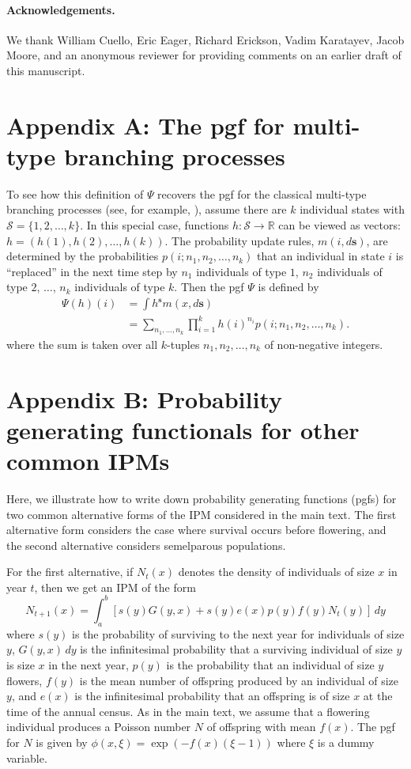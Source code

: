 \documentclass[12pt]{amsart}\usepackage[]{graphicx}\usepackage[]{color}
\def\R{\mathbb R}
\def\S{\mathcal S}
\def\s{\mathbf s}
\begin{document}
\vskip 0.1in
\paragraph{\bf Acknowledgements.} We thank William Cuello, Eric Eager, Richard Erickson, Vadim Karatayev, Jacob Moore, and an anonymous reviewer for providing comments on an earlier draft of this manuscript.


\newpage
\section*{Appendix A: The pgf for multi-type branching processes}
To see how this definition of $\Psi$ recovers the pgf for the classical multi-type branching processes (see, for example, \citet{caswell-01}),  assume there are $k$ individual states with $\S=\{1,2,\dots,k\}$. In this special case, functions $h:\S\to \R$ can be viewed as vectors: $h=(h(1),h(2),\dots,h(k))$. The probability update rules, $m(i,d\s)$, are determined by the probabilities $p(i;n_1,n_2,\dots,n_k)$ that an individual in state $i$ is ``replaced'' in the next time step by  $n_1$ individuals of type $1$, $n_2$ individuals of type $2$, $\dots$, $n_k$ individuals of type $k$. Then the pgf $\Psi$ is defined by
\[
\begin{aligned}
\Psi(h)(i)&=\int h^\s m(x,d\s)\\
&= \sum_{n_1,\dots,n_k} \prod_{i=1}^k h(i)^{n_i} p(i;n_1,n_2,\dots,n_k).
\end{aligned}
\]
where the sum is taken over all $k$-tuples $n_1,n_2,\dots,n_k$ of non-negative integers.

\newpage

\section*{Appendix B: Probability generating functionals for other common IPMs}
Here, we illustrate how to write down probability generating functions (pgfs) for two common alternative forms of the IPM considered in the main text. The first alternative form considers the case where survival occurs before flowering, and the second alternative considers semelparous populations.

For the first alternative, if $N_t(x)$ denotes the density of individuals of size $x$ in year $t$, then we get an IPM of the form
\[
N_{t+1}(x)=\int_a^b \left[ s(y)G(y, x)+s(y)e(x)p(y)f(y)N_t(y)\right]\, dy
\]
where $s(y)$ is the probability of surviving to the next year for individuals of size $y$, $G(y, x) \, dy$ is the infinitesimal probability that a surviving individual of size $y$ is size $x$ in the next year, $p(y)$ is the probability that an individual of size $y$ flowers, $f(y)$ is the mean number of offspring produced by an individual of size $y$, and $e(x)$ is the infinitesimal probability that an offspring is of size $x$ at the time of the annual census. As in the main text, we assume that a flowering individual produces a Poisson number $N$ of offspring with mean $f(x)$. The pgf for $N$ is given by $\phi(x, \xi)=\exp(-f(x)(\xi-1))$ where $\xi$ is a dummy variable.
\end{document}
